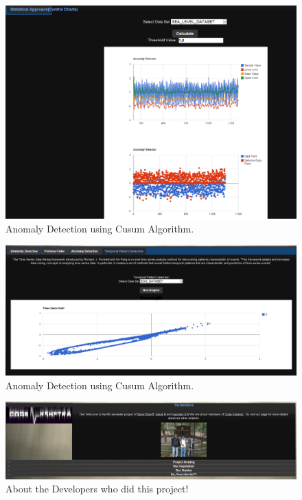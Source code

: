 \documentclass[12pt,a4paper]{report}
\begin{document}
\begin{figure}[h!]
  
  \centering
    \includegraphics[scale=0.350]{./screenshots/ano_stat_app_2.png}
\caption{Anomaly Detection using Cusum Algorithm.}
\end{figure}

\begin{figure}[h!]
  
  \centering
    \includegraphics[scale=0.350]{./screenshots/temp_pattern.png}
\caption{Anomaly Detection using Cusum Algorithm.}
\end{figure}
\begin{figure}[h!]
  
  \centering
    \includegraphics[scale=0.35]{./screenshots/about_us.png}
\caption{About the Developers who did this project!}
\end{figure}
\end{document}
